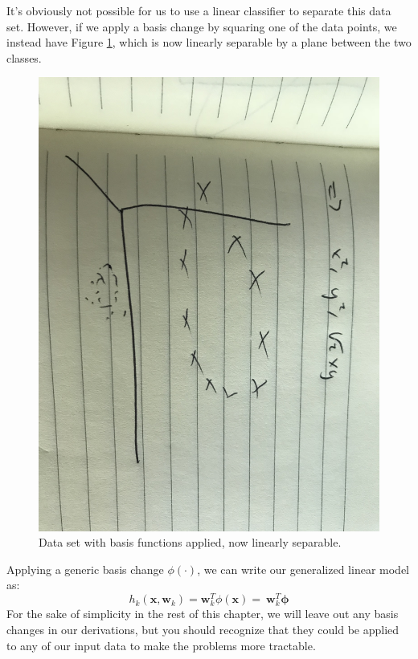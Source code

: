 It's obviously not possible for us to use a linear classifier to separate this data set. However, if we apply a basis change by squaring one of the data points, we instead have Figure \ref{fig:circles-with-basis-change}, which is now linearly separable by a plane between the two classes.
\begin{figure}
    \centering
    \includegraphics[width=0.5\paperwidth]{../Classification/fig/circles_with_basis_change.jpg}
    \caption{Data set with basis functions applied, now linearly separable.}
    \label{fig:circles-with-basis-change}
\end{figure}
Applying a generic basis change $\phi(\cdot)$, we can write our generalized linear model as:
\begin{equation} \label{basis-changed-linear-model}
    h_{k}(\textbf{x}, \textbf{w}_{k}) = \textbf{w}_{k}^{T}\phi{(\textbf{x})} = \ \textbf{w}_{k}^{T}\boldsymbol{\phi}
\end{equation}
For the sake of simplicity in the rest of this chapter, we will leave out any basis changes in our derivations, but you should recognize that they could be applied to any of our input data to make the problems more tractable.

